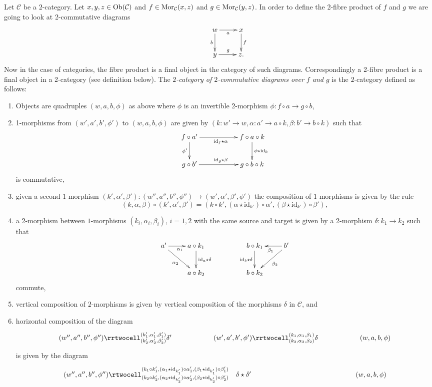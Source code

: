 \medskip\noindent
Let $\mathcal{C}$ be a $2$-category. Let $x, y, z\in \mathop{\mathrm{Ob}}\nolimits(\mathcal{C})$ and
$f\in \mathop{\mathrm{Mor}}\nolimits_\mathcal{C}(x, z)$ and $g\in \mathop{\mathrm{Mor}}\nolimits_{\mathcal C}(y, z)$.
In order to define the 2-fibre product of $f$ and $g$ we are going to look at
2-commutative diagrams
$$
\xymatrix{
& w \ar[r]_a \ar[d]_b & x \ar[d]^{f} \\
& y \ar[r]^{g} & z. }
$$
Now in the case of categories, the fibre product is a final object in the
category of such diagrams. Correspondingly a 2-fibre product is a final object
in a 2-category (see definition below). The {\it $2$-category
of $2$-commutative diagrams over $f$ and $g$}
is the $2$-category defined as follows:
\begin{enumerate}
\item Objects are quadruples $(w, a, b, \phi)$ as above where $\phi$
is an invertible 2-morphism $\phi : f \circ a \to g \circ b$,
\item 1-morphisms from $(w', a', b', \phi')$ to $(w, a, b, \phi)$ are given by
$(k : w' \to w, \alpha : a' \to a \circ k, \beta : b' \to b \circ k)$
such that
$$
\xymatrix{
f \circ a'
\ar[rr]_{\text{id}_f \star \alpha}
\ar[d]_{\phi'}
& &
f \circ a \circ k
\ar[d]^{\phi \star \text{id}_k}
\\
g \circ b'
\ar[rr]^{\text{id}_g \star \beta}
& &
g \circ b \circ k
}
$$
is commutative,
\item given a second $1$-morphism
$(k', \alpha', \beta') : (w'', a'', b'', \phi'') \to
(w', \alpha', \beta', \phi')$ the composition of $1$-morphisms
is given by the rule
$$
(k, \alpha, \beta) \circ (k', \alpha', \beta') =
(k \circ k',
(\alpha \star \text{id}_{k'}) \circ \alpha',
(\beta \star \text{id}_{k'}) \circ \beta'),
$$
\item a 2-morphism between $1$-morphisms
$(k_i, \alpha_i, \beta_i)$, $i = 1, 2$ with the same source and target
is given by a 2-morphism $\delta : k_1 \to k_2$ such that
$$
\xymatrix{
a'
\ar[rd]_{\alpha_2}
\ar[r]_{\alpha_1} &
a \circ k_1
\ar[d]^{\text{id}_a \star \delta} &
&
b \circ k_1
\ar[d]_{\text{id}_b \star \delta} &
b'
\ar[l]^{\beta_1}
\ar[ld]^{\beta_2}
\\
&
a \circ k_2
&
&
b \circ k_2
&
}
$$
commute,
\item vertical composition of $2$-morphisms is given by
vertical composition of the morphisms $\delta$ in $\mathcal{C}$, and
\item horizontal composition of the diagram
$$
\xymatrix{
(w'', a'', b'', \phi'')
\rrtwocell^{(k'_1, \alpha'_1, \beta'_1)}_{(k'_2, \alpha'_2, \beta'_2)}{\delta'}
& &
(w', a', b', \phi')
\rrtwocell^{(k_1, \alpha_1, \beta_1)}_{(k_2, \alpha_2, \beta_2)}{\delta}
& &
(w, a, b, \phi)
}
$$
is given by the diagram
$$
\xymatrix@C=12pc{
(w'', a'', b'', \phi'')
\rtwocell^{(k_1 \circ k'_1, (\alpha_1 \star \text{id}_{k'_1}) \circ \alpha'_1, (\beta_1 \star \text{id}_{k'_1}) \circ \beta'_1)}_{(k_2 \circ k'_2, (\alpha_2 \star \text{id}_{k'_2}) \circ \alpha'_2, (\beta_2 \star \text{id}_{k'_2}) \circ \beta'_2)}{\ \ \ \delta \star \delta'}
&
(w, a, b, \phi)
}
$$
\end{enumerate}
